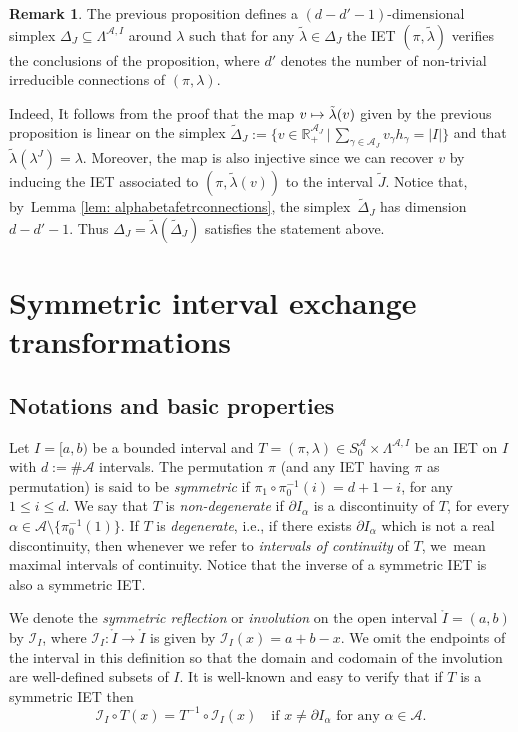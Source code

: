 \documentclass[JEP,XML,SOM,Unicode,NoEqCountersInSection,NoFloatCountersInSection,published]{cedram}
\newcommand\mto{\mathchoice{\longmapsto}{\mapsto}{\mapsto}{\mapsto}}
\theoremstyle{plain}
\theoremstyle{definition}
\newtheorem{remark}[theorem]{Remark}
\newcommand{\A}{\mathcal{A}}
\newcommand{\R}{\mathbb{R}}
\begin{document}
\begin{remark}
\label{rmk:simplex}
The previous proposition defines a $(d - d' - 1)$-dimensional simplex $\Delta_J \subseteq \Lambda^{\A, I}$ around $\lambda$ such that for any $\tilde \lambda \in \Delta_J$ the IET $(\pi, \tilde\lambda)$ verifies the conclusions of the proposition, where $d'$ denotes the number of non-trivial {irreducible} connections of $(\pi, \lambda)$.

Indeed, It follows from the proof that the map $v \mto \tilde{\lambda}(v)$ given by the previous proposition is linear on the simplex $\tilde \Delta_J:= \big\{v \in \R^{\A_J}_+ \, \big| \, \sum_{\gamma \in \A_J} v_\gamma h_\gamma = |I| \big\} $ and that $\tilde\lambda(\lambda^J) = \lambda$. Moreover, the map is also injective since we can recover $v$ by inducing the IET associated to $(\pi, \tilde\lambda(v))$ to the interval $\tilde J$. Notice that, by~Lemma \ref{lem: alphabetafetrconnections}, the simplex~$\tilde \Delta_J$ has dimension $d - d' -1$. Thus $\Delta_J = \tilde\lambda(\tilde \Delta_J)$ satisfies the statement above.
\end{remark}

\section{Symmetric interval exchange transformations}

\subsection{Notations and basic properties}
Let $I = [a, b)$ be a bounded interval and $T=(\pi, \lambda) \in S_0^\A \times \Lambda^{\A, I}$ be an IET on $I$ with $d := \#\A$ intervals. The permutation $\pi$ (and any IET having $\pi$ as permutation) is said to be \textit{symmetric} if $\pi_{1}\circ \pi^{-1}_{0}(i)=d+1-i$, for any $1 \leq i \leq d$. We say that $T$ is \emph{non-degenerate} if $\partial I_{\alpha}$ is a discontinuity of $T$, for every $\alpha\in \A {\setminus \{\pi_0^{-1}(1)\}}$. If $T$ is \emph{degenerate}, i.e., if there exists $\partial I_{\alpha}$ which is not a real discontinuity, then whenever we refer to \emph{intervals of continuity} of $T$, we~mean maximal intervals of continuity. Notice that the inverse of a symmetric IET is also a symmetric IET.

We denote the \emph{symmetric reflection} or \emph{involution} on the open interval $\mathring{I} = (a, b)$ by $\mathcal{I}_I$, where $\mathcal{I}_I: \mathring{I}\to \mathring{I}$ is given by $\mathcal{I}_I(x)= a + b - x$. We omit the endpoints of the interval in this definition so that the domain and codomain of the involution are well-defined subsets of $I$.
It is well-known and easy to verify that if $T$ is a symmetric IET then
\begin{equation}\label{eq: standardconjugacy}
\mathcal{I}_I\circ T(x)=T^{-1}\circ\mathcal{I}_I(x) \quad \text{if } x \neq \partial I_{\alpha} \text{ for any } \alpha \in \A.
\end{equation}
\end{document}
